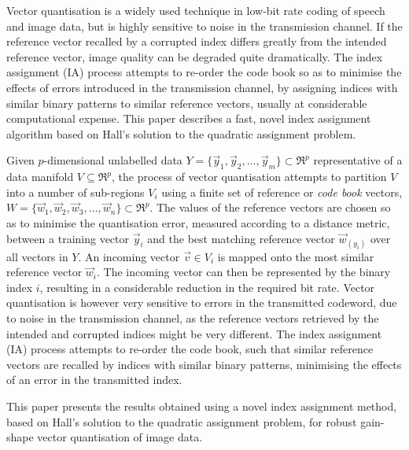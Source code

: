 \documentclass[a4paper]{report}
\begin{document}


Vector quantisation is a widely used technique in low-bit rate coding of speech
and image data, but is highly sensitive to noise in the transmission channel.
If the reference vector recalled by a corrupted index differs greatly from the
intended reference vector, image quality can be degraded quite dramatically.
The index assignment (IA) process attempts to re-order the code book so as to
minimise the effects of errors introduced in the transmission channel, by
assigning indices with similar binary patterns to similar reference vectors,
usually at considerable computational expense.  This paper describes a fast,
novel index assignment algorithm based on Hall's solution to the quadratic
assignment problem.


Given $p$-dimensional unlabelled data
$Y = \{\vec{y}_1, \vec{y}_2, \ldots, \vec{y}_m\}\subset\Re^p$ representative
of a data manifold $V \subseteq\Re^p$, the process
of vector quantisation attempts to partition $V$ into a number
of sub-regions $V_i$ using a finite set of reference or \emph{code book}
vectors, $W = \{\vec{w}_1, \vec{w}_2, \vec{w}_3, \ldots, \vec{w}_n\}
\subset\Re^p$.  The values of the reference vectors are chosen so as
to minimise the quantisation error, measured according to a distance metric,
between a training vector $\vec{y}_i$ and the best matching reference vector
$\vec{w}_{(y_i)}$ over all vectors in $Y$.  An incoming vector
$\vec{v} \in V_i$ is mapped onto the most similar reference vector
$\vec{w}_i$.  The incoming vector can then be represented by the binary index $i$,
resulting in a considerable reduction in the required bit rate.
Vector quantisation is however very sensitive to errors in the transmitted
codeword, due to noise in the transmission channel, as the reference vectors
retrieved by the intended and corrupted indices might be very different.  The
index assignment (IA) process attempts to re-order the code book, such that
similar reference vectors are recalled by indices with similar binary
patterns, minimising the effects of an error in the
transmitted index.

This paper presents the results obtained using a novel index assignment
method, based on Hall's solution to the quadratic
assignment problem, for robust gain-shape vector quantisation of
image data.
\end{document}
